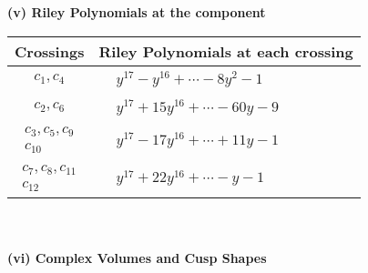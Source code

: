 \documentclass[1p]{elsarticle_modified}
\theoremstyle{definition}
\begin{document}
\newpage\renewcommand{\arraystretch}{1}
\flushleft \textbf{(v) Riley Polynomials at the component}\newline \\
\begin{tabular}{m{50pt}|m{274pt}}
Crossings & \hspace{64pt}Riley Polynomials at each crossing \\
\hline $$\begin{aligned}c_{1},c_{4}\end{aligned}$$&$\begin{aligned}
&y^{17}- y^{16}+\cdots-8 y^2-1
\end{aligned}$\\
\hline $$\begin{aligned}c_{2},c_{6}\end{aligned}$$&$\begin{aligned}
&y^{17}+15 y^{16}+\cdots-60 y-9
\end{aligned}$\\
\hline $$\begin{aligned}c_{3},c_{5},c_{9}\\c_{10}\end{aligned}$$&$\begin{aligned}
&y^{17}-17 y^{16}+\cdots+11 y-1
\end{aligned}$\\
\hline $$\begin{aligned}c_{7},c_{8},c_{11}\\c_{12}\end{aligned}$$&$\begin{aligned}
&y^{17}+22 y^{16}+\cdots- y-1
\end{aligned}$\\
\hline
\end{tabular}\\~\\
\newpage\flushleft \textbf{(vi) Complex Volumes and Cusp Shapes}
\end{document}
